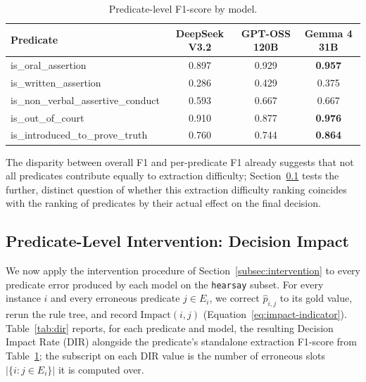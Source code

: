 \begin{table}[htbp]
\centering
\caption{Predicate-level F1-score by model.}
\label{tab:per-predicate-f1}
\begin{tabular}{lccc}
\toprule
\textbf{Predicate} & \textbf{DeepSeek V3.2} & \textbf{GPT-OSS 120B} & \textbf{Gemma 4 31B} \\
\midrule
is\_oral\_assertion                & 0.897 & 0.929 & \textbf{0.957} \\
is\_written\_assertion             & 0.286 & 0.429 & 0.375 \\
is\_non\_verbal\_assertive\_conduct & 0.593 & 0.667 & 0.667 \\
is\_out\_of\_court                 & 0.910 & 0.877 & \textbf{0.976} \\
is\_introduced\_to\_prove\_truth   & 0.760 & 0.744 & \textbf{0.864} \\
\bottomrule
\end{tabular}
\end{table}

The disparity between overall F1 and per-predicate F1 already suggests that not all predicates contribute equally to extraction difficulty; Section~\ref{subsec:dir-results} tests the further, distinct question of whether this extraction difficulty ranking coincides with the ranking of predicates by their actual effect on the final decision.

\subsection{Predicate-Level Intervention: Decision Impact}
\label{subsec:dir-results}
We now apply the intervention procedure of Section~\ref{subsec:intervention} to every predicate error produced by each model on the \texttt{hearsay} subset. For every instance $i$ and every erroneous predicate $j \in E_i$, we correct $\hat{p}_{i,j}$ to its gold value, rerun the rule tree, and record $\mathrm{Impact}(i,j)$ (Equation~\ref{eq:impact-indicator}). Table~\ref{tab:dir} reports, for each predicate and model, the resulting Decision Impact Rate (DIR) alongside the predicate's standalone extraction F1-score from Table~\ref{tab:per-predicate-f1}; the subscript on each DIR value is the number of erroneous slots $|\{i : j \in E_i\}|$ it is computed over.

